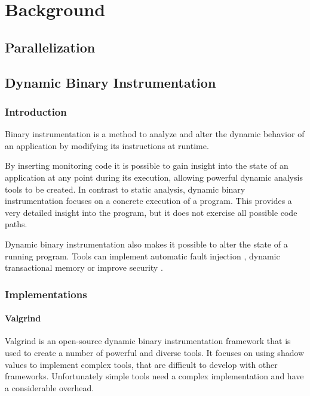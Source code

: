 \chapter{Background}

\section {Parallelization}

\section {Dynamic Binary Instrumentation}

\subsection{Introduction}

Binary instrumentation is a method to analyze and alter the dynamic behavior of an application by modifying its instructions at runtime. 


By inserting monitoring code it is possible to gain insight into the state of an application at any point during its execution, allowing powerful dynamic analysis tools to be created. In contrast to static analysis, dynamic binary instrumentation focuses on a concrete execution of a program. This provides a very detailed insight into the program, but it does not exercise all possible code paths.

Dynamic binary instrumentation also makes it possible to alter the state of a running program. Tools can implement automatic fault injection \cite{faultinject}, dynamic transactional memory \cite{dynamicstm} or improve security \cite{dynamicstackprotect}.

\subsection{Implementations}
\subsubsection{Valgrind}

Valgrind \cite{valgrind} is an open-source dynamic binary instrumentation framework that is used to create a number of powerful and diverse tools. It focuses on using shadow values to implement complex tools, that are difficult to develop with other frameworks. Unfortunately simple tools need a complex implementation and have a considerable overhead.


